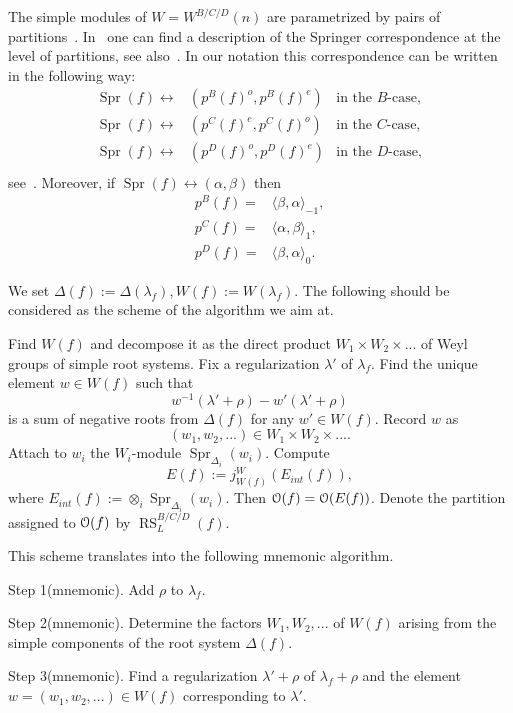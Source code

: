 \documentclass{emsprocart}
\begin{document}
The simple modules of $W=W^{B/C/D}(n)$ are parametrized by pairs of partitions~\cite{Barbasch-Vogan}. In~\cite{Cr} one can find a description of the Springer correspondence at the level of partitions, see also~\cite{Barbasch-Vogan}. In our notation this correspondence can be written in the following way:
$$\begin{array}{ccc}\operatorname{Spr}(f)\leftrightarrow&(p^B(f)^o, p^B(f)^e)&\mbox{in the $B$-case},\\
\operatorname{Spr}(f)\leftrightarrow&(p^C(f)^e, p^C(f)^o)&\mbox{in the $C$-case},\\
\operatorname{Spr}(f)\leftrightarrow&(p^D(f)^o, p^D(f)^e)&\mbox{in the $D$-case},\\
\end{array}$$
see~\cite[p.~165]{Barbasch-Vogan}. Moreover, if $\operatorname{Spr}(f)\leftrightarrow(\alpha, \beta)$ then
$$\begin{array}{ccc}p^B(f)=&\langle\beta, \alpha\rangle_{-1},\\
p^C(f)=&\langle\alpha, \beta\rangle_{1},\\
p^D(f)=&\langle\beta, \alpha\rangle_{0}.\end{array}$$

We set $\Delta(f):=\Delta(\lambda_f), W(f):=W(\lambda_f)$. The following should be considered as the scheme of the algorithm we aim at.

Find $W(f)$ and decompose it as the direct product $W_1\times W_2\times...$ of Weyl groups of simple root systems. Fix a regularization $\lambda'$ of $\lambda_f$. Find the unique element $w\in W(f)$ such that $$w^{-1}(\lambda'+\rho)-w'(\lambda'+\rho)$$ is a sum of negative roots from $\Delta(f)$ for any $w'\in W(f)$. Record $w$ as $$(w_1, w_2,...)\in W_1\times W_2\times....$$ Attach to $w_i$ the $W_i$-module $\operatorname{Spr}_{\Delta_i}(w_i)$. Compute $$E(f):=j_{W(f)}^W(E_{int}(f)),$$ where $E_{int}(f):=\otimes_i \operatorname{Spr}_{\Delta_i}(w_i)$. Then $\EuScript O(f)=\EuScript O(E(f))$. Denote the partition assigned to $\EuScript O(f)$ by $\operatorname{RS}^{B/C/D}_L(f)$.

This scheme translates into the following mnemonic algorithm.

Step 1(mnemonic). Add $\rho$ to $\lambda_f$.

Step 2(mnemonic). Determine the factors $W_1, W_2,...$ of $W(f)$ arising from the simple components of the root system $\Delta(f)$.

Step 3(mnemonic). Find a regularization $\lambda'+\rho$ of $\lambda_f+\rho$ and the element $w=(w_1, w_2,...)\in W(f)$ corresponding to $\lambda'$.
\end{document}
